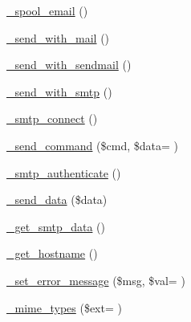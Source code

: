 \begin{DoxyCompactItemize}
\item 
\hyperlink{class_c_i___email_a5d45a2f98c27332dfe78086c88eafd3c}{\+\_\+spool\+\_\+email} ()
\item 
\hyperlink{class_c_i___email_ae7e626556c4d619a7214bee6056badd4}{\+\_\+send\+\_\+with\+\_\+mail} ()
\item 
\hyperlink{class_c_i___email_a22ce9dc271da86e2a25041aa70e02502}{\+\_\+send\+\_\+with\+\_\+sendmail} ()
\item 
\hyperlink{class_c_i___email_a691e57a39f6f8956c5054fd7b109bb12}{\+\_\+send\+\_\+with\+\_\+smtp} ()
\item 
\hyperlink{class_c_i___email_ae57fde4883dcd1dec9f8999efef13f06}{\+\_\+smtp\+\_\+connect} ()
\item 
\hyperlink{class_c_i___email_a155a184147ad666ce5282c73f5a55fa1}{\+\_\+send\+\_\+command} (\$cmd, \$data= \textquotesingle{}\textquotesingle{})
\item 
\hyperlink{class_c_i___email_a708494a94d2083993ede37cf65a0c0fa}{\+\_\+smtp\+\_\+authenticate} ()
\item 
\hyperlink{class_c_i___email_a42fa768e8678b3c1462762b9b812a302}{\+\_\+send\+\_\+data} (\$data)
\item 
\hyperlink{class_c_i___email_ac421324c92e681315a1f2d0d7fa96a5b}{\+\_\+get\+\_\+smtp\+\_\+data} ()
\item 
\hyperlink{class_c_i___email_ad2d333b7bb9f6c25400714dd8931fe11}{\+\_\+get\+\_\+hostname} ()
\item 
\hyperlink{class_c_i___email_a5611627355586be39c5949ede1807c38}{\+\_\+set\+\_\+error\+\_\+message} (\$msg, \$val= \textquotesingle{}\textquotesingle{})
\item 
\hyperlink{class_c_i___email_a475debba7acb75f5e72e7f0c60e6a3f1}{\+\_\+mime\+\_\+types} (\$ext= \textquotesingle{}\textquotesingle{})
\end{DoxyCompactItemize}
